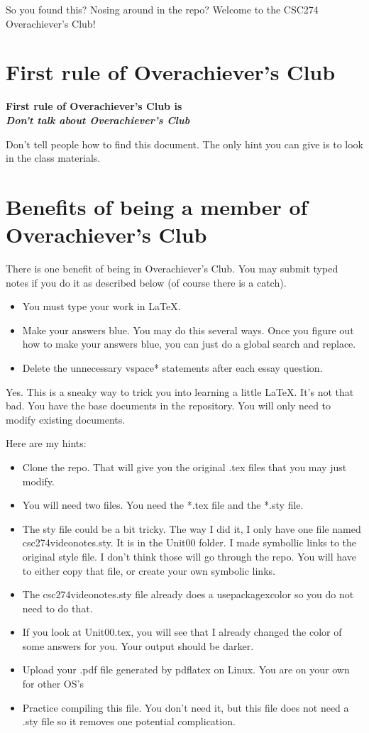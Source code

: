 \documentclass{article}
\begin{document}
So you found this?  Nosing around in the repo?  Welcome to the CSC274 Overachiever's Club!

\section*{First rule of Overachiever's Club}
\begin{center}
    \textbf{First rule of Overachiever's Club is \\\emph{Don't talk about Overachiever's Club}}
\end{center}

Don't tell people how to find this document.  The only hint you can give is to look in the class materials.

\section*{Benefits of being a member of Overachiever's Club}

There is one benefit of being in Overachiever's Club.  You may submit typed notes if you do it as
described below (of course there is a catch).
\begin{itemize}
    \item You must type your work in \LaTeX.
    \item Make your answers blue.  You may do this several ways. Once you figure out how to make your answers blue, you can just do a global search and replace.
    \item Delete the unnecessary vspace* statements after each essay question.
\end{itemize}

Yes.  This is a sneaky way to trick you into learning a little \LaTeX.  
It's not that bad.  You have the base documents in the repository. 
You will only need to modify existing documents.

Here are my hints:
\begin{itemize}
    \item Clone the repo.  That will give you the original .tex files that you may just modify.
    \item You will need two files.  You need the *.tex file and the *.sty file.
    \item The sty file could be a bit tricky.  The way I did it, I only have one file named csc274videonotes.sty.  It is in the Unit00 folder.  I made symbollic links to the original style file.  I don't think those will go through the repo.  You will have to either copy that file, or create your own symbolic links.
    \item The csc274videonotes.sty file already does a usepackage{xcolor} so you do not need to do that.  
    \item If you look at Unit00.tex, you will see that I already changed the color of some answers for you.  Your output should be darker.
    \item Upload your .pdf file generated by pdflatex on Linux.  You are on your own for other OS's
    \item Practice compiling this file.  You don't need it, but this file does not need a .sty file so it removes one potential complication.
\end{itemize}
\end{document}
